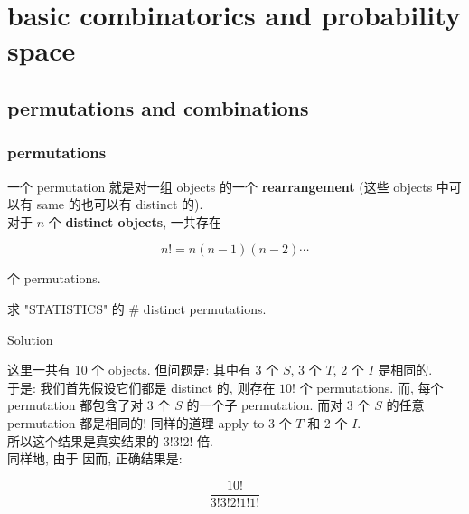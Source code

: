 \chapter{basic combinatorics and probability space}\label{basic-combinatorics-and-probability-space}

\section{permutations and combinations}\label{permutations-and-combinations}

\subsection{permutations}\label{permutations}

\begin{definition}{}

一个 permutation 就是对一组 objects 的一个 \textbf{rearrangement} (这些 objects 中可以有 same 的也可以有 distinct 的).\\
对于 \(\mathit{n}\) 个 \textbf{distinct objects}, 一共存在

\[\mathit{n}! = \mathit{n}(\mathit{n} - 1)(\mathit{n} - 2)\cdots\]

个 permutations.

\end{definition}

\begin{example}

求 "STATISTICS" 的 \# distinct permutations.

\end{example}

\begin{qlsolution}{Solution}

这里一共有 10 个 objects. 但问题是: 其中有 3 个 \(\mathit{S}\), 3 个 \(\mathit{T}\), 2 个 \(\mathit{I}\) 是相同的.\\
于是: 我们首先假设它们都是 distinct 的, 则存在 \(10!\) 个 permutations. 而, 每个 permutation 都包含了对 3 个 \(\mathit{S}\) 的一个子 permutation. 而对 3 个 \(\mathit{S}\) 的任意 permutation 都是相同的! 同样的道理 apply to 3 个 \(\mathit{T}\) 和 2 个 \(\mathit{I}\).\\
所以这个结果是真实结果的 \(3!3!2!\) 倍.\\
同样地, 由于 因而, 正确结果是:

\[\frac{10!}{3!3!2!1!1!}\]

\end{qlsolution}

